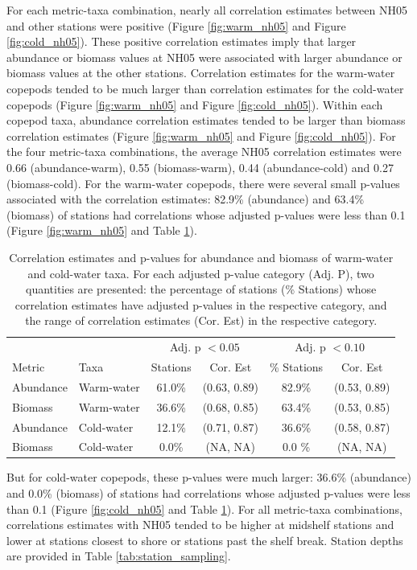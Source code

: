 \documentclass[preprint, authoryear, 12pt]{elsarticle}
\begin{document}
For each metric-taxa combination, nearly all correlation estimates between NH05 and other stations were positive (Figure \ref{fig:warm_nh05} and Figure \ref{fig:cold_nh05}). These positive correlation estimates imply that larger abundance or biomass values at NH05 were associated with larger abundance or biomass values at the other stations. Correlation estimates for the warm-water copepods tended to be much larger than correlation estimates for the cold-water copepods (Figure \ref{fig:warm_nh05} and Figure \ref{fig:cold_nh05}).  Within each copepod taxa, abundance correlation estimates tended to be larger than biomass correlation estimates (Figure \ref{fig:warm_nh05} and Figure \ref{fig:cold_nh05}). For the four metric-taxa combinations, the average NH05 correlation estimates were 0.66 (abundance-warm), 0.55 (biomass-warm), 0.44 (abundance-cold) and 0.27 (biomass-cold). For the warm-water copepods, there were several small p-values associated with the correlation estimates: 82.9\% (abundance) and 63.4\% (biomass) of stations had correlations whose adjusted p-values were less than 0.1 (Figure \ref{fig:warm_nh05} and Table \ref{tab:warmcold_nh05}).
\begin{table}
    \footnotesize
    \centering
    \begin{tabular}{llcccc}
    \hline
    \hline
          & & \multicolumn{2}{c}{Adj. p $< 0.05$} & \multicolumn{2}{c}{Adj. p $< 0.10$} \\
          Metric & Taxa & Stations & Cor. Est & \% Stations & Cor. Est \\
         \hline
         Abundance & Warm-water  & 61.0\% &  (0.63, 0.89) & 82.9\% & (0.53, 0.89) \\
         Biomass & Warm-water  & 36.6\% & (0.68, 0.85) & 63.4\% & (0.53, 0.85) \\
         Abundance & Cold-water & 12.1\% &  (0.71, 0.87) & 36.6\% & (0.58, 0.87) \\
         Biomass & Cold-water & 0.0\% & (NA, NA) & 0.0 \% & (NA, NA) \\
         \hline
    \end{tabular}
    \caption{Correlation estimates and p-values for abundance and biomass of warm-water and cold-water taxa. For each adjusted p-value category (Adj. P), two quantities are presented: the percentage of stations (\% Stations) whose correlation estimates have adjusted p-values in the respective category, and the range of correlation estimates (Cor. Est) in the respective category.}
    \label{tab:warmcold_nh05}
\end{table}
But for cold-water copepods, these p-values were much larger: 36.6\% (abundance) and 0.0\% (biomass) of stations had correlations whose adjusted p-values were less than 0.1 (Figure \ref{fig:cold_nh05} and Table \ref{tab:warmcold_nh05}).
For all metric-taxa combinations, correlations estimates with NH05 tended to be higher at midshelf stations and lower at stations closest to shore or stations past the shelf break. Station depths are provided in Table \ref{tab:station_sampling}. 
\end{document}
